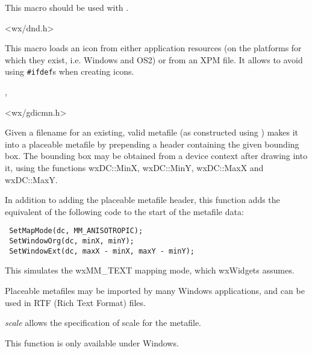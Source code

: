 This macro should be used with
.


<wx/dnd.h>


\label{wxiconmacro}


This macro loads an icon from either application resources (on the platforms
for which they exist, i.e. Windows and OS2) or from an XPM file. It allows to
avoid using {\tt \#ifdef}s when creating icons.


,


<wx/gdicmn.h>


\label{wxmakemetafileplaceable}


Given a filename for an existing, valid metafile (as constructed using )
makes it into a placeable metafile by prepending a header containing the given
bounding box. The bounding box may be obtained from a device context after drawing
into it, using the functions wxDC::MinX, wxDC::MinY, wxDC::MaxX and wxDC::MaxY.

In addition to adding the placeable metafile header, this function adds
the equivalent of the following code to the start of the metafile data:

\begin{verbatim}
 SetMapMode(dc, MM_ANISOTROPIC);
 SetWindowOrg(dc, minX, minY);
 SetWindowExt(dc, maxX - minX, maxY - minY);
\end{verbatim}

This simulates the wxMM\_TEXT mapping mode, which wxWidgets assumes.

Placeable metafiles may be imported by many Windows applications, and can be
used in RTF (Rich Text Format) files.

{\it scale} allows the specification of scale for the metafile.

This function is only available under Windows.


